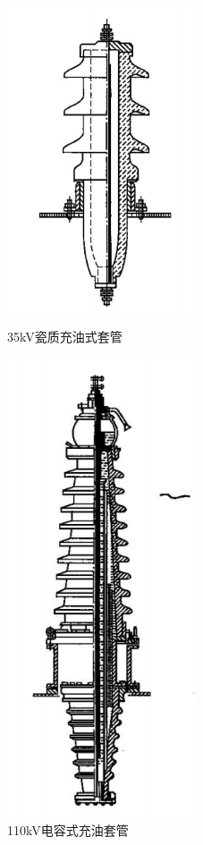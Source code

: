 \documentclass{book}
\begin{document}
\begin{figure}  %
	\begin{minipage}[H]{0.4\linewidth}  
		\centering  
		\includegraphics[width=2.2in]{2-9.png}  
		
		\caption{35kV瓷质充油式套管}
		\label{fig:2.9} 
	\end{minipage}
	\begin{minipage}[H]{0.4\linewidth}  
		\centering  
		\includegraphics[width=2.2in]{2-10.png}  
		
		\caption{110kV电容式充油套管} 
		\label{fig:2.10} 
	\end{minipage}
\end{figure} 
\end{document}
